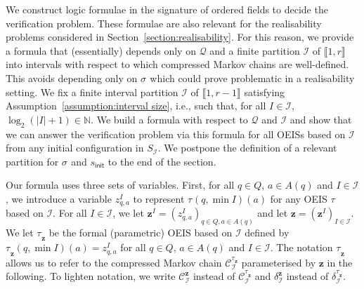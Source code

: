 \documentclass[a4paper,UKenglish,cleveref,autoref,thm-restate,colorlinks]{lipics-v2021}
\newcommand{\init}{\mathsf{init}}
\newcommand{\integerInterval}[1]{\llbracket{}#1\rrbracket{}}
\newcommand{\IN}{\mathbb{N}}
\newcommand{\mdpStateSpace}{S}
\newcommand{\mdpTrans}{\delta}
\newcommand{\ocmdp}{\mathcal{Q}}
\newcommand{\ocStateSpace}{Q}
\newcommand{\ocState}{q}
\newcommand{\ocConfig}{s}
\newcommand{\ocActionSpace}{A}
\newcommand{\ocAction}{a}
\newcommand{\counterUB}{r}
\newcommand{\mchain}{\mathcal{C}}
\newcommand{\intPart}{\mathcal{I}}
\newcommand{\interval}{I}
\newcommand{\compressChainStrat}[1]{\mchain^{#1}_{\intPart}}
\newcommand{\compressChainStateSpace}{\mdpStateSpace_{\intPart}}
\newcommand{\compressChainTransTemplate}[2]{\mdpTrans^{#1}_{#2}}
\newcommand{\varStrat}{z}
\newcommand{\varStratI}{\mathbf{\varStrat}^{\interval}}
\newcommand{\varStratTuple}{\mathbf{\varStrat}}
\newcommand{\compressChainSymbolicVerbose}{\compressChainStrat{\stratB_{\varStratTuple}}}
\newcommand{\compressChainSymbolic}{\compressChainStrat{\varStratTuple}}
\newcommand{\compressChainTransSymbolicVerbose}{\compressChainTransTemplate{\stratB_{\varStratTuple}}{\intPart}}
\newcommand{\compressChainTransSymbolic}{\compressChainTransTemplate{\varStratTuple}{\intPart}}
\newcommand{\stratGeneric}[1]{{\sigma_{#1}}}
\newcommand{\strat}{\stratGeneric{}}
\newcommand{\stratBGeneric}[1]{{\tau_{#1}}}
\newcommand{\stratB}{\stratBGeneric{}}
\begin{document}
We construct logic formulae in the signature of ordered fields to decide the verification problem.
These formulae are also relevant for the realisability problems considered in Section~\ref{section:realisability}.
For this reason, we provide a formula that (essentially) depends only on $\ocmdp$ and a finite partition $\intPart$ of $\integerInterval{1, \counterUB}$ into intervals with respect to which compressed Markov chains are well-defined.
This avoids depending only on $\strat$ which could prove problematic in a realisability setting.
We fix a finite interval partition $\intPart$ of $\integerInterval{1, \counterUB-1}$ satisfying Assumption~\ref{assumption:interval size}, i.e., such that, for all $\interval\in\intPart$, $\log_2(|\interval|+1)\in\IN$.
We build a formula with respect to $\ocmdp$ and $\intPart$ and show that we can answer the verification problem via this formula for all OEISs based on $\intPart$ from any initial configuration in $\compressChainStateSpace$.
We postpone the definition of a relevant partition for $\strat$ and $\ocConfig_\init$ to the end of the section.



Our formula uses three sets of variables.
First, for all $\ocState\in\ocStateSpace$, $\ocAction\in\ocActionSpace(\ocState)$ and $\interval\in\intPart$, we introduce a variable $\varStrat_{\ocState, \ocAction}^\interval$ to represent $\stratB(\ocState,\min\interval)(\ocAction)$ for any OEIS $\stratB$ based on $\intPart$.
For all $\interval\in\intPart$, we let $\varStratI = (\varStrat^\interval_{\ocState, \ocAction})_{\ocState\in\ocStateSpace, \ocAction\in\ocActionSpace(\ocState)}$ and let $\varStratTuple=(\varStratI)_{\interval\in\intPart}$.
We let $\stratB_{\varStratTuple}$ be the formal (parametric) OEIS based on $\intPart$ defined by $\stratB_{\varStratTuple}(\ocState, \min\interval)(\ocAction) = \varStrat^\interval_{\ocState, \ocAction}$ for all $\ocState\in\ocStateSpace$, $\ocAction\in\ocActionSpace(\ocState)$ and $\interval\in\intPart$.
The notation $\stratB_{\varStratTuple}$ allows us to refer to the compressed Markov chain $\compressChainSymbolicVerbose$ parameterised by $\varStratTuple$ in the following.
To lighten notation, we write $\compressChainSymbolic$ instead of $\compressChainSymbolicVerbose$ and $\compressChainTransSymbolic$ instead of $\compressChainTransSymbolicVerbose$.
\end{document}

